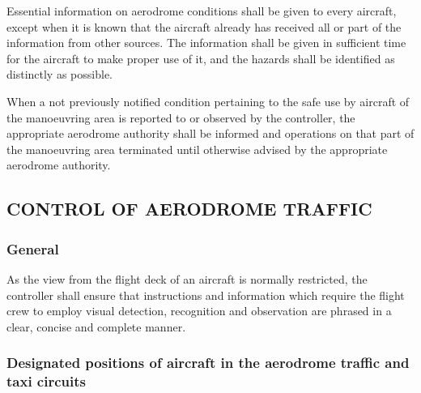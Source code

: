 \begin{enumnoss}

    \item Essential information on aerodrome conditions shall be given to every aircraft, except when it is known that the aircraft already has received all or part of the information from other sources. The information shall be given in sufficient time for the aircraft to make proper use of it, and the hazards shall be identified as distinctly as possible.


    \item When a not previously notified condition pertaining to the safe use by aircraft of the manoeuvring area is reported to or observed by the controller, the appropriate aerodrome authority shall be informed and operations on that part of the manoeuvring area terminated until otherwise advised by the appropriate aerodrome authority.
\end{enumnoss}

\subsection[Control of aerodrome traffic]{CONTROL OF AERODROME TRAFFIC}

\subsubsection{General}

As the view from the flight deck of an aircraft is normally restricted, the controller shall ensure that instructions and information which require the flight crew to employ visual detection, recognition and observation are phrased in a clear, concise and complete manner.

\subsubsection{Designated positions of aircraft in the aerodrome traffic and taxi circuits} \label{7.6.2}

